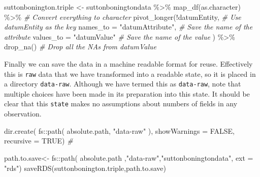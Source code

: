 \documentclass{article}
\newenvironment{Shaded}{\begin{snugshade}}{\end{snugshade}}
\newcommand{\AttributeTok}[1]{\textcolor[rgb]{0.77,0.63,0.00}{#1}}
\newcommand{\CommentTok}[1]{\textcolor[rgb]{0.56,0.35,0.01}{\textit{#1}}}
\newcommand{\ConstantTok}[1]{\textcolor[rgb]{0.00,0.00,0.00}{#1}}
\newcommand{\FunctionTok}[1]{\textcolor[rgb]{0.00,0.00,0.00}{#1}}
\newcommand{\NormalTok}[1]{#1}
\newcommand{\OtherTok}[1]{\textcolor[rgb]{0.56,0.35,0.01}{#1}}
\newcommand{\SpecialCharTok}[1]{\textcolor[rgb]{0.00,0.00,0.00}{#1}}
\newcommand{\StringTok}[1]{\textcolor[rgb]{0.31,0.60,0.02}{#1}}
\begin{document}
\begin{Shaded}
\begin{Highlighting}[]
\NormalTok{suttonbonington.triple }\OtherTok{\textless{}{-}}\NormalTok{ suttonboningtondata }\SpecialCharTok{\%\textgreater{}\%} 
                  \FunctionTok{map\_df}\NormalTok{(as.character) }\SpecialCharTok{\%\textgreater{}\%} \CommentTok{\# Convert everything to character}
                  \FunctionTok{pivot\_longer}\NormalTok{(}\SpecialCharTok{!}\NormalTok{datumEntity, }\CommentTok{\# Use datumEntity as the key}
                  \AttributeTok{names\_to =} \StringTok{"datumAttribute"}\NormalTok{, }\CommentTok{\# Save the name of the attribute}
                  \AttributeTok{values\_to =} \StringTok{"datumValue"} \CommentTok{\# Save the name of the value}
\NormalTok{                  ) }\SpecialCharTok{\%\textgreater{}\%} 
                  \FunctionTok{drop\_na}\NormalTok{() }\CommentTok{\# Drop all the NAs from datumValue}
\end{Highlighting}
\end{Shaded}

Finally we can save the data in a machine readable format for reuse. Effectively this is \texttt{raw} data that we have transformed into a readable state, so it is placed in a directory \texttt{data-raw}. Although we have termed this as \texttt{data-raw}, note that multiple choices have been made in its preparation into this state. It should be clear that this \texttt{state} makes no assumptions about numbers of fields in any observation.

\begin{Shaded}
\begin{Highlighting}[]
\FunctionTok{dir.create}\NormalTok{( }
\NormalTok{          fs}\SpecialCharTok{::}\FunctionTok{path}\NormalTok{( absolute.path,}
            \StringTok{"data{-}raw"}\NormalTok{ ),  }
            \AttributeTok{showWarnings =} \ConstantTok{FALSE}\NormalTok{,}
            \AttributeTok{recursive =} \ConstantTok{TRUE}\NormalTok{) }\CommentTok{\# }

\NormalTok{path.to.save}\OtherTok{\textless{}{-}}\NormalTok{ fs}\SpecialCharTok{::}\FunctionTok{path}\NormalTok{( absolute.path}
\NormalTok{                               ,}\StringTok{"data{-}raw"}\NormalTok{,}\StringTok{"suttonboningtondata"}\NormalTok{, }\AttributeTok{ext =} \StringTok{"rds"}\NormalTok{)}
\FunctionTok{saveRDS}\NormalTok{(suttonbonington.triple,path.to.save)}
\end{Highlighting}
\end{Shaded}
\end{document}
